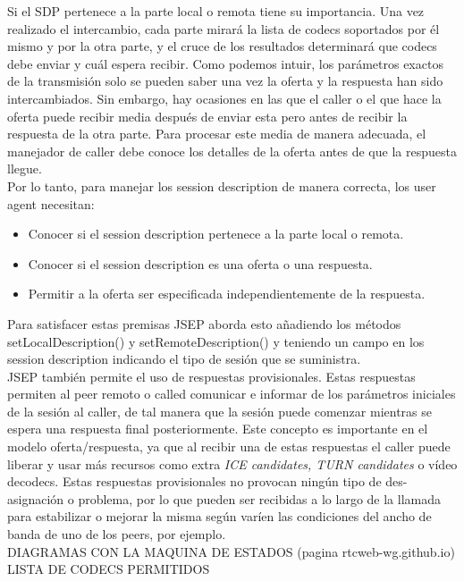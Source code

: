 Si el SDP pertenece a la parte local o remota tiene su importancia. Una vez realizado el intercambio, cada parte mirará la lista de codecs soportados por él mismo y por la otra parte, y el cruce de los resultados determinará que codecs debe enviar y cuál espera recibir. Como podemos intuir, los parámetros exactos de la transmisión solo se pueden saber una vez la oferta y la respuesta han sido intercambiados. Sin embargo, hay ocasiones en las que el caller o el que hace la oferta puede recibir media después de enviar esta pero antes de recibir la respuesta de la otra parte. Para procesar este media de manera adecuada, el manejador de caller debe conoce los detalles de la oferta antes de que la respuesta llegue.\\

Por lo tanto, para manejar los session description de manera correcta, los user agent necesitan:

\begin{itemize}
\item Conocer si el session description pertenece a la parte local o remota.
\item Conocer si el session description es una oferta o una respuesta.
\item Permitir a la oferta ser especificada independientemente de la respuesta.
\end{itemize}

Para satisfacer estas premisas JSEP aborda esto añadiendo los métodos setLocalDescription() y setRemoteDescription() y teniendo un campo en los session description indicando el tipo de sesión que se suministra.\\

JSEP también permite el uso de respuestas provisionales. Estas respuestas permiten al peer remoto o called comunicar e informar de los parámetros iniciales de la sesión al caller, de tal manera que la sesión puede comenzar mientras se espera una respuesta final posteriormente. Este concepto es importante en el modelo oferta/respuesta, ya que al recibir una de estas respuestas el caller puede liberar y usar más recursos como extra \textit{ICE candidates, TURN candidates} o vídeo decodecs. Estas respuestas provisionales no provocan ningún tipo de des-asignación o problema, por lo que pueden ser recibidas a lo largo de la llamada para estabilizar o mejorar la misma según varíen las condiciones del ancho de banda de uno de los peers, por ejemplo.\\


DIAGRAMAS CON LA MAQUINA DE ESTADOS (pagina rtcweb-wg.github.io)
LISTA DE CODECS PERMITIDOS



